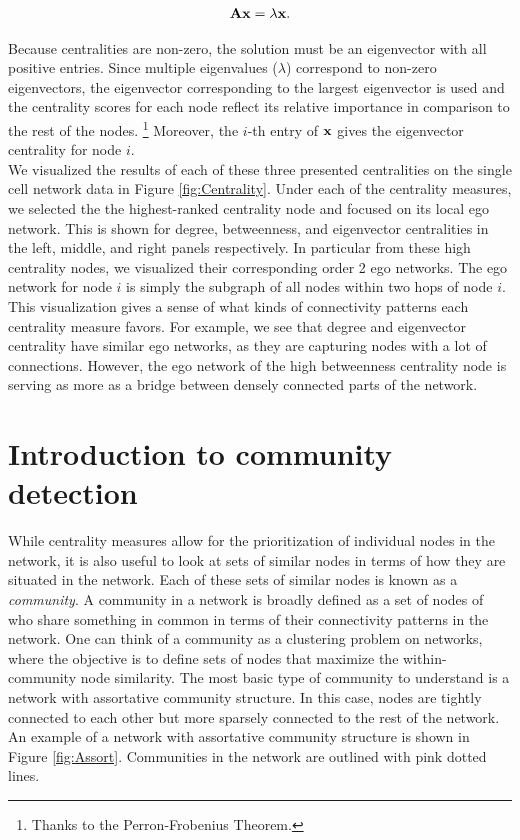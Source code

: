 \begin{equation}
{\bf A}{\bf x}=\lambda{\bf x}.
\end{equation}

Because centralities are non-zero, the solution must be an eigenvector with all positive entries. Since multiple eigenvalues ($\lambda$) correspond to non-zero eigenvectors, the eigenvector corresponding to the largest eigenvector is used and the centrality scores for each node reflect its relative importance in comparison to the rest of the nodes. \footnote{Thanks to the Perron-Frobenius Theorem.} Moreover, the $i$-th entry of ${\bf x}$ gives the eigenvector centrality for node $i$. \\

\indent We visualized the results of each of these three presented centralities on the single cell network data in Figure \ref{fig:Centrality}. Under each of the centrality measures, we selected the the highest-ranked centrality node and focused on its local ego network. This is shown for degree, betweenness, and eigenvector centralities in the left, middle, and right panels respectively. In particular from these high centrality nodes, we visualized their corresponding order 2 ego networks.  The ego network for node $i$ is simply the subgraph of all nodes within two hops of node $i$. This visualization gives a sense of what kinds of connectivity patterns each centrality measure favors. For example, we see that degree and eigenvector centrality have similar ego networks, as they are capturing nodes with a lot of connections. However, the ego network of the high betweenness centrality node is serving as more as a bridge between densely connected parts of the network. 

\section{Introduction to community detection}
While centrality measures allow for the prioritization of individual nodes in the network, it is also useful to look at sets of similar nodes in terms of how they are situated in the network. Each of these sets of similar nodes is known as a \emph{community}. A community in a network is broadly defined as a set of nodes of who share something in common in terms of their connectivity patterns in the network. One can think of a community as a clustering problem on networks, where the objective is to define sets of nodes that maximize the within-community node similarity. The most basic type of community to understand is a network with assortative community structure. In this case, nodes are tightly connected to each other but more sparsely connected to the rest of the network. An example of a network with assortative community structure is shown in Figure \ref{fig:Assort}. Communities in the network are outlined with pink dotted lines.

